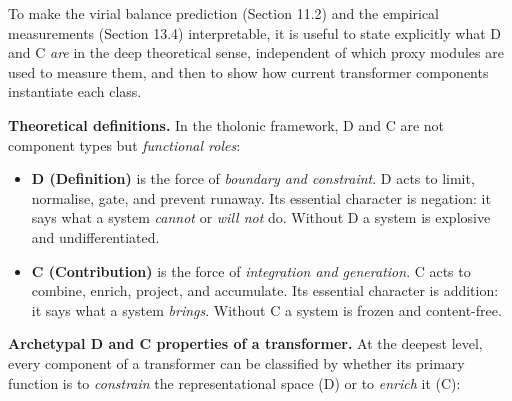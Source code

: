 \documentclass[
  11pt,
  letterpaper,
]{article}
\providecommand{\tightlist}{%
  \setlength{\itemsep}{0pt}\setlength{\parskip}{0pt}}
\begin{document}
To make the virial balance prediction (Section 11.2) and the empirical
measurements (Section 13.4) interpretable, it is useful to state
explicitly what D and C \emph{are} in the deep theoretical sense,
independent of which proxy modules are used to measure them, and then to
show how current transformer components instantiate each class.

\textbf{Theoretical definitions.} In the tholonic framework, D and C are
not component types but \emph{functional roles}:

\begin{itemize}
\tightlist
\item
  \textbf{D (Definition)} is the force of \emph{boundary and
  constraint}. D acts to limit, normalise, gate, and prevent runaway.
  Its essential character is negation: it says what a system
  \emph{cannot} or \emph{will not} do. Without D a system is explosive
  and undifferentiated.
\item
  \textbf{C (Contribution)} is the force of \emph{integration and
  generation}. C acts to combine, enrich, project, and accumulate. Its
  essential character is addition: it says what a system \emph{brings}.
  Without C a system is frozen and content-free.
\end{itemize}

\textbf{Archetypal D and C properties of a transformer.} At the deepest
level, every component of a transformer can be classified by whether its
primary function is to \emph{constrain} the representational space (D)
or to \emph{enrich} it (C):
\end{document}
